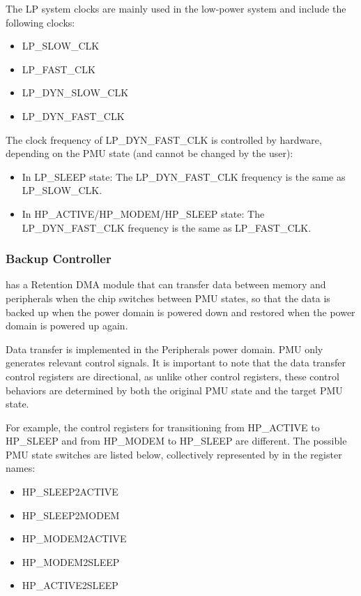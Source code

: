 \documentclass[main\_\_EN.tex]{subfiles}
\begin{document}
The LP system clocks are mainly used in the low-power system and include the following clocks:

    \begin{itemize}
    \item LP\_SLOW\_CLK
    \item LP\_FAST\_CLK
    \item LP\_DYN\_SLOW\_CLK
    \item LP\_DYN\_FAST\_CLK
    \end{itemize}

The clock frequency of LP\_DYN\_FAST\_CLK is controlled by hardware, depending on the PMU state (and cannot be changed by the user):

    \begin{itemize}
    \item In LP\_SLEEP state: The LP\_DYN\_FAST\_CLK frequency is the same as LP\_SLOW\_CLK.
    \item In HP\_ACTIVE/HP\_MODEM/HP\_SLEEP state: The LP\_DYN\_FAST\_CLK frequency is the same as LP\_FAST\_CLK.
    \end{itemize}

\subsubsection{Backup Controller}

\chipname{} has a Retention DMA module that can transfer data between memory and peripherals when the chip switches between PMU states, so that the data is backed up when the power domain is powered down and restored when the power domain is powered up again.

Data transfer is implemented in the Peripherals power domain. PMU only generates relevant control signals. It is important to note that the data transfer control registers are directional, as unlike other control registers, these control behaviors are determined by both the original PMU state and the target PMU state.

For example, the control registers for transitioning from HP\_ACTIVE to HP\_SLEEP and from HP\_MODEM to HP\_SLEEP are different. The possible PMU state switches are listed below, collectively represented by  in the register names:

\begin{itemize}
    \item HP\_SLEEP2ACTIVE
    \item HP\_SLEEP2MODEM
    \item HP\_MODEM2ACTIVE
    \item HP\_MODEM2SLEEP
    \item HP\_ACTIVE2SLEEP
\end{itemize}
\end{document}
